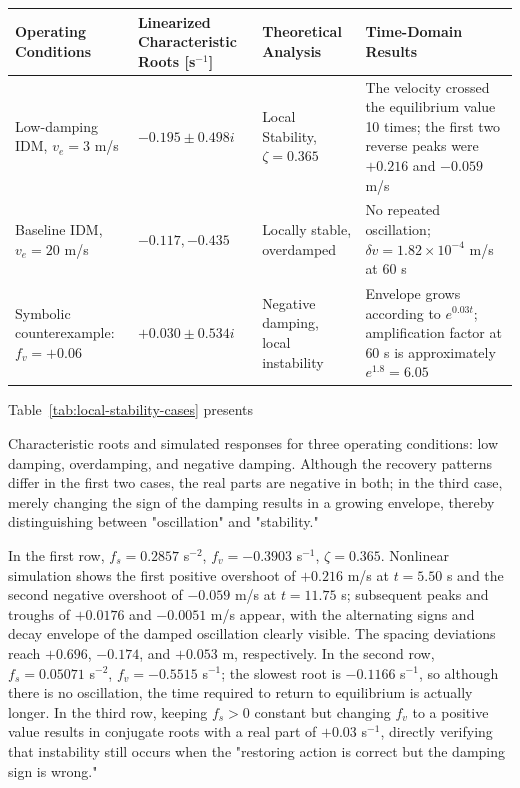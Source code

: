 \documentclass[11pt,a4paper,openany]{book}
\numberwithin{equation}{chapter}
\numberwithin{figure}{chapter}
\numberwithin{table}{chapter}
\newcommand{\tabletext}[2]{%
  \par\smallskip\noindent
  Table~\ref{#1} presents #2
\par\smallskip
}
\begin{document}
\begin{center}
\small
{}
\label{tab:local-stability-cases}
\begin{tabular}{p{3.2cm}p{3.4cm}p{3.5cm}p{3.4cm}}
\toprule
\textbf{Operating Conditions} & \textbf{Linearized Characteristic Roots [s$^{-1}$]
} & \textbf{Theoretical Analysis} & \textbf{Time-Domain Results} \\
\midrule







Low-damping IDM, $v_e=3$ m/s& $-0.195\pm0.498i$ & Local Stability, $\zeta=0.365$




&




 The velocity crossed the equilibrium value 10 times; the first two reverse peaks were $+0.216$ and $-0.059$ m/s




\\[3pt]
Baseline IDM, $v_e=20$ m/s

& $-0.117,-0.435$ &

Locally stable, overdamped&No repeated oscillation; $\delta v=1.82\times10^{-4}$ m/s at 60 s
\\[3pt]
Symbolic counterexample: $f_v=+0.06$

& $+0.030\pm0.534i$ &

Negative damping, local instability

&

Envelope grows according to $e^{0.03t}$; amplification factor at 60 s is approximately $e^{1.8}=6.05$
\\
\bottomrule
\end{tabular}
\end{center}
\tabletext{tab:local-stability-cases}{

Characteristic roots and simulated responses for three operating conditions: low damping, overdamping, and negative damping. Although the recovery patterns differ in the first two cases, the real parts are negative in both; in the third case, merely changing the sign of the damping results in a growing envelope, thereby distinguishing between "oscillation" and "stability."}In the first row, $f_s=0.2857$ s$^{-2}$, $f_v=-0.3903$ s$^{-1}$, $\zeta=0.365$. Nonlinear simulation shows the first positive overshoot of $+0.216$ m/s at $t=5.50$ s and the second negative overshoot of $-0.059$ m/s at $t=11.75$ s; subsequent peaks and troughs of $+0.0176$ and $-0.0051$ m/s appear, with the alternating signs and decay envelope of the damped oscillation clearly visible. The spacing deviations reach $+0.696$, $-0.174$, and $+0.053$ m, respectively. In the second row, $f_s=0.05071$ s$^{-2}$, $f_v=-0.5515$ s$^{-1}$; the slowest root is $-0.1166$ s$^{-1}$, so although there is no oscillation, the time required to return to equilibrium is actually longer. In the third row, keeping $f_s>0$ constant but changing $f_v$ to a positive value results in conjugate roots with a real part of $+0.03$ s$^{-1}$, directly verifying that instability still occurs when the "restoring action is correct but the damping sign is wrong."
\end{document}
